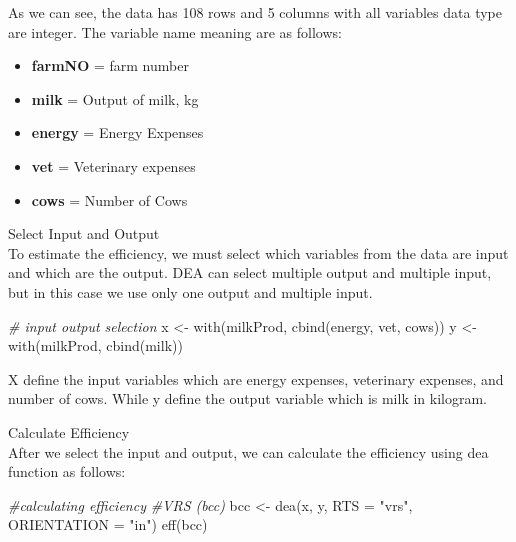 \documentclass[
]{article}
\newenvironment{Shaded}{\begin{snugshade}}{\end{snugshade}}
\newcommand{\AttributeTok}[1]{\textcolor[rgb]{0.77,0.63,0.00}{#1}}
\newcommand{\CommentTok}[1]{\textcolor[rgb]{0.56,0.35,0.01}{\textit{#1}}}
\newcommand{\FunctionTok}[1]{\textcolor[rgb]{0.00,0.00,0.00}{#1}}
\newcommand{\NormalTok}[1]{#1}
\newcommand{\OtherTok}[1]{\textcolor[rgb]{0.56,0.35,0.01}{#1}}
\newcommand{\StringTok}[1]{\textcolor[rgb]{0.31,0.60,0.02}{#1}}
\providecommand{\tightlist}{%
  \setlength{\itemsep}{0pt}\setlength{\parskip}{0pt}}
\begin{document}
As we can see, the data has 108 rows and 5 columns with all variables
data type are integer. The variable name meaning are as follows:

\begin{itemize}
\tightlist
\item
  \textbf{farmNO} = farm number\\
\item
  \textbf{milk} = Output of milk, kg\\
\item
  \textbf{energy} = Energy Expenses\\
\item
  \textbf{vet} = Veterinary expenses\\
\item
  \textbf{cows} = Number of Cows
\end{itemize}

Select Input and Output\\
To estimate the efficiency, we must select which variables from the data
are input and which are the output. DEA can select multiple output and
multiple input, but in this case we use only one output and multiple
input.

\begin{Shaded}
\begin{Highlighting}[]
\CommentTok{\# input output selection}
\NormalTok{x }\OtherTok{\textless{}{-}} \FunctionTok{with}\NormalTok{(milkProd, }\FunctionTok{cbind}\NormalTok{(energy, vet, cows))}
\NormalTok{y }\OtherTok{\textless{}{-}} \FunctionTok{with}\NormalTok{(milkProd, }\FunctionTok{cbind}\NormalTok{(milk))}
\end{Highlighting}
\end{Shaded}

X define the input variables which are energy expenses, veterinary
expenses, and number of cows. While y define the output variable which
is milk in kilogram.

Calculate Efficiency\\
After we select the input and output, we can calculate the efficiency
using dea function as follows:

\begin{Shaded}
\begin{Highlighting}[]
\CommentTok{\#calculating efficiency}
\CommentTok{\#VRS (bcc)}
\NormalTok{bcc }\OtherTok{\textless{}{-}} \FunctionTok{dea}\NormalTok{(x, y, }\AttributeTok{RTS =} \StringTok{"vrs"}\NormalTok{, }\AttributeTok{ORIENTATION =} \StringTok{"in"}\NormalTok{)}
\FunctionTok{eff}\NormalTok{(bcc)}
\end{Highlighting}
\end{Shaded}
\end{document}
